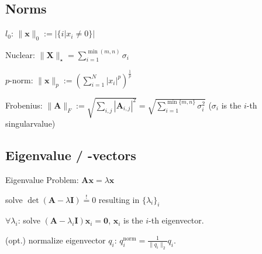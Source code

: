 \documentclass[a4paper, 11pt, landscape]{article}
\begin{document}
\begin{multicols*}{3}
    \subsection{Norms}
    \begin{inparadesc}
    \item[\color{red}$l_0$:] $\|\mathbf{x}\|_0 := |\{i | x_i \neq 0\}|$
    \item[\color{red}Nuclear:] $\|\mathbf{X}\|_\star = \sum_{i=1}^{\min(m, n)} \sigma_i$
    \item[\color{red}$p$-norm:] $\|\mathbf{x}\|_p := \left( \sum_{i=1}^{N} |x_i|^p \right)^{\frac{1}{p}}$
    \item[\color{red}Frobenius:] $\|\mathbf{A}\|_F :=\allowbreak \sqrt{\sum_{i,j}|\mathbf{A}_{i, j}|^2} =\allowbreak \sqrt{\sum_{i=1}^{\min\{m, n\}} \sigma_i^2}$ ($\sigma_i$ is the $i$-th singularvalue)
    \end{inparadesc}


    \subsection{Eigenvalue / -vectors}
    Eigenvalue Problem: $\mathbf{Ax} = \lambda \mathbf{x}$
    \begin{compactenum}
    \item solve $\operatorname{det}(\mathbf{A} - \lambda \mathbf{I}) \overset{!}{=} 0$ resulting in $\{\lambda_i\}_i$
    \item $\forall \lambda_i$:
        solve $(\mathbf{A} - \lambda_i \mathbf{I}) \mathbf{x}_i = \mathbf{0}$, $\mathbf{x}_i$ is the $i$-th eigenvector.
    \item (opt.) normalize eigenvector $q_i$: $q_i^{\text{norm}} = \frac{1}{\|q_i\|_2} q_i$.
    \end{compactenum}


\end{multicols*}
\end{document}
